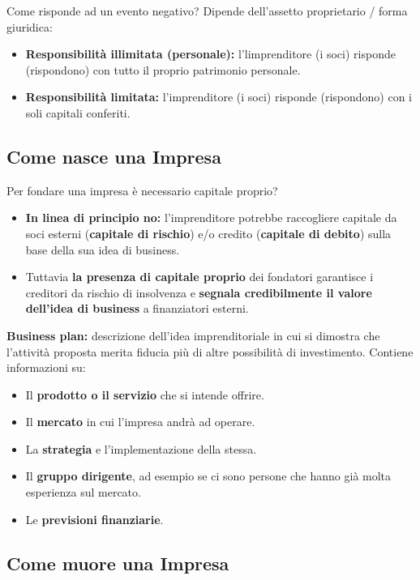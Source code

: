 \documentclass[../main.tex]{subfiles}
\begin{document}
Come risponde ad un evento negativo? Dipende dell'assetto proprietario / forma giuridica:
\begin{itemize}
\item
\textbf{Responsibilità illimitata (personale):} l'limprenditore  (i soci) risponde (rispondono) con tutto il proprio patrimonio personale.
\item
\textbf{Responsibilità limitata:} l'imprenditore (i soci) risponde (rispondono) con i soli capitali conferiti.
\end{itemize}

\subsection{Come nasce una Impresa}

Per fondare una impresa è necessario capitale proprio?
\begin{itemize}
\item
\textbf{In linea di principio no:} l'imprenditore potrebbe raccogliere capitale da soci esterni (\textbf{capitale di rischio}) e/o credito (\textbf{capitale di debito}) sulla base della sua idea di business.

\item
Tuttavia \textbf{la presenza di capitale proprio} dei fondatori garantisce i creditori da rischio di insolvenza e \textbf{segnala credibilmente il valore dell'idea di business} a finanziatori esterni.
\end{itemize}

\textbf{Business plan:} descrizione dell'idea imprenditoriale in cui si dimostra che l'attività proposta merita fiducia più di altre possibilità di investimento. Contiene informazioni su:
\begin{itemize}
\item Il \textbf{prodotto o il servizio} che si intende offrire.
\item Il \textbf{mercato} in cui l'impresa andrà ad operare.
\item La \textbf{strategia} e l'implementazione della stessa.
\item Il \textbf{gruppo dirigente}, ad esempio se ci sono persone che hanno già molta esperienza sul mercato.
\item Le \textbf{previsioni finanziarie}.
\end{itemize}

\subsection{Come muore una Impresa}
\end{document}

